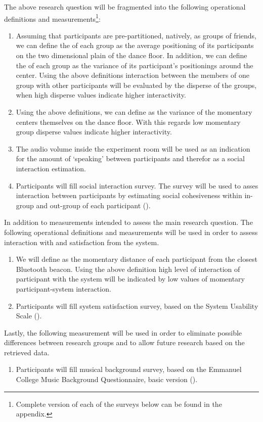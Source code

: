 The above research question will be fragmented into the following operational definitions and measurements\footnote{Complete version of each of the surveys below can be found in the appendix.}:
\begin{enumerate}
	\item \label{measure:disperse} Assuming that participants are pre-partitioned, natively, as groups of friends, we can define the  of each group as the average positioning of its participants on the two dimensional plain of the dance floor.
	In addition, we can define the  of each group as the variance of its participant's positionings around the center.
	Using the above definitions interaction between the members of one group with other participants will be evaluated by the disperse of the groups, when high disperse values indicate higher interactivity.
	\item \label{measure:groups} Using the above definitions, we can define  as the variance of the momentary centers themselves on the dance floor.
	With this regards low momentary group disperse values indicate higher interactivity.
	\item \label{measure:audio} The audio volume inside the experiment room will be used as an indication for the amount of `speaking' between participants and therefor as a social interaction estimation.
	\item \label{measure:survey:social} Participants will fill social interaction survey.
	The survey will be used to asses interaction between participants by estimating social cohesiveness within in-group and out-group of each participant ().
\end{enumerate}
In addition to measurements intended to assess the main research question.
The following operational definitions and measurements will be used in order to assess interaction with and satisfaction from the system.
\begin{enumerate}[resume]
	\item \label{measure:system} We will define  as the momentary distance of each participant from the closest Bluetooth beacon.
	Using the above definition high level of interaction of participant with the system will be indicated by low values of momentary participant-system interaction.
	\item \label{measure:survey:usability} Participants will fill system satisfaction survey, based on the System Usability Scale (\cite{brooke96}).
\end{enumerate}
Lastly, the following measurement will be used in order to eliminate possible differences between research groups and to allow future research based on the retrieved data.
\begin{enumerate}[resume]
	\item \label{measure:survey:musical} Participants will fill musical background survey, based on the Emmanuel College Music Background Questionnaire, basic version (\cite{web:zhao12}).
\end{enumerate}

